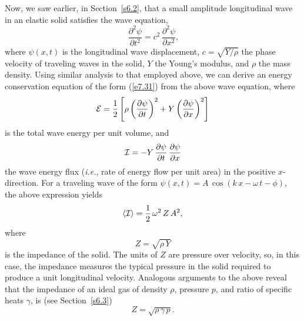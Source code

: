 Now, we saw earlier, in Section~\ref{s6.2}, that a small amplitude longitudinal wave in
an elastic solid satisfies the wave equation,
\begin{equation}\
\frac{\partial^2 \psi}{\partial t^2} = c^2\,\frac{\partial^2 \psi}{\partial x^2},
\end{equation}
where $\psi(x,t)$ is the longitudinal wave displacement, $c=\sqrt{Y/\rho}$  the phase velocity of traveling waves in the solid, $Y$ the Young's modulus, and $\rho$ the
mass density. Using similar analysis to that employed above, 
we can derive an energy conservation equation of the form (\ref{e7.31}) from the
above wave equation, where
\begin{equation}
{\cal E} = \frac{1}{2}\left[\rho\left(\frac{\partial\psi}{\partial t}\right)^2 + Y\left(\frac{\partial \psi}{\partial x}\right)^2\right]
\end{equation}
is the total wave energy per unit volume, and
\begin{equation}
{\cal I} = - Y\,\frac{\partial\psi}{\partial t}\,\frac{\partial\psi}{\partial x}
\end{equation}
the wave energy flux ({\em i.e.}, rate of energy flow per unit area) in the positive $x$-direction. 
For a traveling wave of the form $\psi(x,t)= A\,\cos(k\,x-\omega\,t-\phi)$, the
above expression yields
\begin{equation}
\langle {\cal I}\rangle =\frac{1}{2}\,\omega^2\,Z\,A^2,
\end{equation}
where
\begin{equation}
Z = \sqrt{\rho\,Y}
\end{equation}
is the  impedance of the solid. The units of $Z$ are pressure over velocity, so, in this
case,  the
impedance measures the typical pressure in the solid required to produce a
unit longitudinal velocity. 
Analogous arguments to the above reveal that the  impedance
of an ideal gas of density $\rho$, pressure $p$, and ratio of specific heats $\gamma$,
is (see Section~\ref{s6.3})
\begin{equation}
Z = \sqrt{\rho\,\gamma\,p}.
\end{equation}

